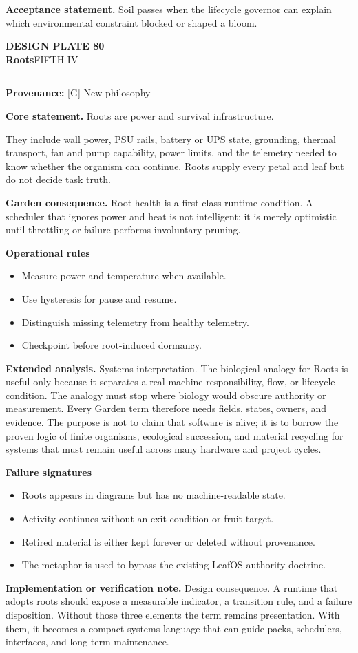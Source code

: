 \documentclass[10pt,letterpaper,oneside]{article}
\newcommand{\prov}[1]{\textcolor{gardenBlue}{\sffamily\footnotesize\textbf{Provenance:} #1}}
\newcommand{\platetitle}[3]{%
  \begin{minipage}[t][0.54in][t]{\textwidth}
  {\sffamily\bfseries\color{gardenDeep}\fontsize{9}{10}\selectfont DESIGN PLATE #1}\\[-1pt]
  {\sffamily\bfseries\color{gardenInk}\fontsize{16.5}{18}\selectfont #2}\hfill{\sffamily\color{gardenGreen}\large #3}
  \end{minipage}\vspace{-2pt}\hrule\vspace{5pt}}
\begin{document}
\begin{acceptbox}
\textbf{Acceptance statement.} Soil passes when the lifecycle governor can explain which environmental constraint blocked or shaped a bloom.
\end{acceptbox}
\newpage
\platetitle{80}{Roots}{FIFTH IV}
\prov{[G] New philosophy}
\fontsize{8.85}{10.45}\selectfont
\begin{corebox}
\textbf{Core statement.} Roots are power and survival infrastructure.
\end{corebox}
They include wall power, PSU rails, battery or UPS state, grounding, thermal transport, fan and pump capability, power limits, and the telemetry needed to know whether the organism can continue. Roots supply every petal and leaf but do not decide task truth.

\textbf{Garden consequence.} Root health is a first-class runtime condition. A scheduler that ignores power and heat is not intelligent; it is merely optimistic until throttling or failure performs involuntary pruning.

\textbf{Operational rules}
\begin{itemize}
\item Measure power and temperature when available.
\item Use hysteresis for pause and resume.
\item Distinguish missing telemetry from healthy telemetry.
\item Checkpoint before root-induced dormancy.
\end{itemize}
\textbf{Extended analysis.} Systems interpretation. The biological analogy for Roots is useful only because it separates a real machine responsibility, flow, or lifecycle condition. The analogy must stop where biology would obscure authority or measurement. Every Garden term therefore needs fields, states, owners, and evidence. The purpose is not to claim that software is alive; it is to borrow the proven logic of finite organisms, ecological succession, and material recycling for systems that must remain useful across many hardware and project cycles.

\textbf{Failure signatures}
\begin{itemize}
\item Roots appears in diagrams but has no machine-readable state.
\item Activity continues without an exit condition or fruit target.
\item Retired material is either kept forever or deleted without provenance.
\item The metaphor is used to bypass the existing LeafOS authority doctrine.
\end{itemize}
\textbf{Implementation or verification note.} Design consequence. A runtime that adopts roots should expose a measurable indicator, a transition rule, and a failure disposition. Without those three elements the term remains presentation. With them, it becomes a compact systems language that can guide packs, schedulers, interfaces, and long-term maintenance.
\end{document}
